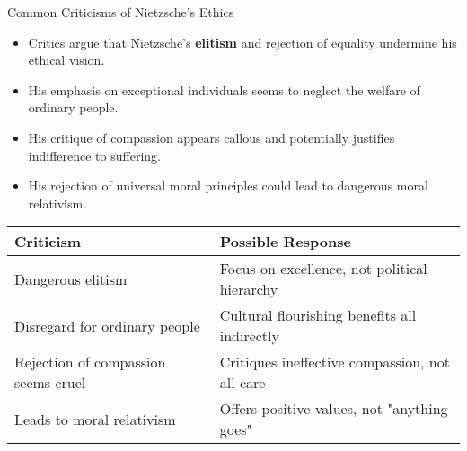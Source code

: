 \documentclass{beamer}
\begin{document}
    \begin{frame}{Common Criticisms of Nietzsche's Ethics}
    \begin{itemize}
    \item Critics argue that Nietzsche's \textbf{elitism} and rejection of equality undermine his ethical vision.
    \item His emphasis on exceptional individuals seems to neglect the welfare of ordinary people.
    \item His critique of compassion appears callous and potentially justifies indifference to suffering.
    \item His rejection of universal moral principles could lead to dangerous moral relativism.
    \end{itemize}
    
    \begin{center}
        \small
    \begin{tabular}{|p{5cm}|p{5cm}|}
    \hline
    \textbf{Criticism} & \textbf{Possible Response} \\
    \hline
    Dangerous elitism & Focus on excellence, not political hierarchy \\
    \hline
    Disregard for ordinary people & Cultural flourishing benefits all indirectly \\
    \hline
    Rejection of compassion seems cruel & Critiques ineffective compassion, not all care \\
    \hline
    Leads to moral relativism & Offers positive values, not "anything goes" \\
    \hline
    \end{tabular}
    \end{center}
    \end{frame}
    
\end{document}
